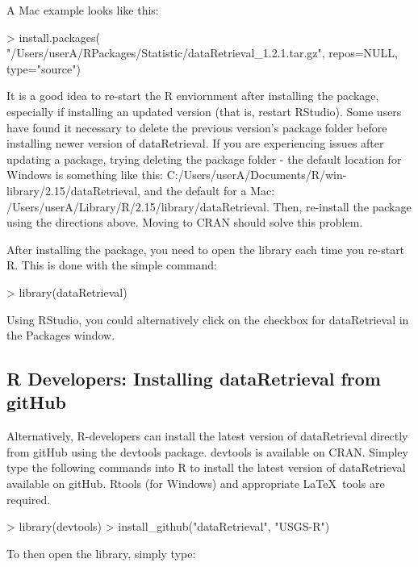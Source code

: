 \documentclass[a4paper,11pt]{article}
\begin{document}
A Mac example looks like this:

\begin{Schunk}
\begin{Sinput}
> install.packages(
   "/Users/userA/RPackages/Statistic/dataRetrieval_1.2.1.tar.gz", 
   repos=NULL, type="source")
\end{Sinput}
\end{Schunk}

It is a good idea to re-start the R enviornment after installing the package, especially if installing an updated version (that is, restart RStudio). Some users have found it necessary to delete the previous version's package folder before installing newer version of dataRetrieval. If you are experiencing issues after updating a package, trying deleting the package folder - the default location for Windows is something like this: C:/Users/userA/Documents/R/win-library/2.15/dataRetrieval, and the default for a Mac: /Users/userA/Library/R/2.15/library/dataRetrieval. Then, re-install the package using the directions above. Moving to CRAN should solve this problem.

After installing the package, you need to open the library each time you re-start R.  This is done with the simple command:
\begin{Schunk}
\begin{Sinput}
> library(dataRetrieval)
\end{Sinput}
\end{Schunk}
Using RStudio, you could alternatively click on the checkbox for dataRetrieval in the Packages window.

\subsection{R Developers: Installing dataRetrieval from gitHub}
Alternatively, R-developers can install the latest version of dataRetrieval directly from gitHub using the devtools package.  devtools is available on CRAN.  Simpley type the following commands into R to install the latest version of dataRetrieval available on gitHub.  Rtools (for Windows) and appropriate \LaTeX\ tools are required.

\begin{Schunk}
\begin{Sinput}
> library(devtools)
> install_github("dataRetrieval", "USGS-R")
\end{Sinput}
\end{Schunk}
To then open the library, simply type:
\end{document}
